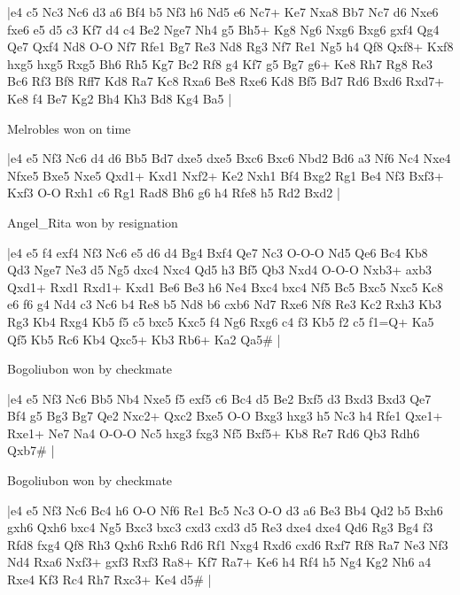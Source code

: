 \makegametitle
|e4 c5 Nc3 Nc6 d3 a6 Bf4 b5 Nf3 h6 Nd5 e6 Nc7+ Ke7 Nxa8 Bb7 Nc7 d6 Nxe6 fxe6 e5 d5 c3 Kf7 d4 c4 Be2 Nge7 Nh4 g5 Bh5+ Kg8 Ng6 Nxg6 Bxg6 gxf4 Qg4 Qe7 Qxf4 Nd8 O-O Nf7 Rfe1 Bg7 Re3 Nd8 Rg3 Nf7 Re1 Ng5 h4 Qf8 Qxf8+ Kxf8 hxg5 hxg5 Rxg5 Bh6 Rh5 Kg7 Bc2 Rf8 g4 Kf7 g5 Bg7 g6+ Ke8 Rh7 Rg8 Re3 Bc6 Rf3 Bf8 Rff7 Kd8 Ra7 Kc8 Rxa6 Be8 Rxe6 Kd8 Bf5 Bd7 Rd6 Bxd6 Rxd7+ Ke8 f4 Be7 Kg2 Bh4 Kh3 Bd8 Kg4 Ba5  |

\showboard

Melrobles won on time

\makegametitle
|e4 e5 Nf3 Nc6 d4 d6 Bb5 Bd7 dxe5 dxe5 Bxc6 Bxc6 Nbd2 Bd6 a3 Nf6 Nc4 Nxe4 Nfxe5 Bxe5 Nxe5 Qxd1+ Kxd1 Nxf2+ Ke2 Nxh1 Bf4 Bxg2 Rg1 Be4 Nf3 Bxf3+ Kxf3 O-O Rxh1 c6 Rg1 Rad8 Bh6 g6 h4 Rfe8 h5 Rd2 Bxd2  |

\showboard

Angel\_Rita won by resignation

\makegametitle
|e4 e5 f4 exf4 Nf3 Nc6 e5 d6 d4 Bg4 Bxf4 Qe7 Nc3 O-O-O Nd5 Qe6 Bc4 Kb8 Qd3 Nge7 Ne3 d5 Ng5 dxc4 Nxc4 Qd5 h3 Bf5 Qb3 Nxd4 O-O-O Nxb3+ axb3 Qxd1+ Rxd1 Rxd1+ Kxd1 Be6 Be3 h6 Ne4 Bxc4 bxc4 Nf5 Bc5 Bxc5 Nxc5 Kc8 e6 f6 g4 Nd4 c3 Nc6 b4 Re8 b5 Nd8 b6 cxb6 Nd7 Rxe6 Nf8 Re3 Kc2 Rxh3 Kb3 Rg3 Kb4 Rxg4 Kb5 f5 c5 bxc5 Kxc5 f4 Ng6 Rxg6 c4 f3 Kb5 f2 c5 f1=Q+ Ka5 Qf5 Kb5 Rc6 Kb4 Qxc5+ Kb3 Rb6+ Ka2 Qa5\#  |

\showboard

Bogoliubon won by checkmate

\makegametitle
|e4 e5 Nf3 Nc6 Bb5 Nb4 Nxe5 f5 exf5 c6 Bc4 d5 Be2 Bxf5 d3 Bxd3 Bxd3 Qe7 Bf4 g5 Bg3 Bg7 Qe2 Nxc2+ Qxc2 Bxe5 O-O Bxg3 hxg3 h5 Nc3 h4 Rfe1 Qxe1+ Rxe1+ Ne7 Na4 O-O-O Nc5 hxg3 fxg3 Nf5 Bxf5+ Kb8 Re7 Rd6 Qb3 Rdh6 Qxb7\#  |

\showboard

Bogoliubon won by checkmate

\makegametitle
|e4 e5 Nf3 Nc6 Bc4 h6 O-O Nf6 Re1 Bc5 Nc3 O-O d3 a6 Be3 Bb4 Qd2 b5 Bxh6 gxh6 Qxh6 bxc4 Ng5 Bxc3 bxc3 cxd3 cxd3 d5 Re3 dxe4 dxe4 Qd6 Rg3 Bg4 f3 Rfd8 fxg4 Qf8 Rh3 Qxh6 Rxh6 Rd6 Rf1 Nxg4 Rxd6 cxd6 Rxf7 Rf8 Ra7 Ne3 Nf3 Nd4 Rxa6 Nxf3+ gxf3 Rxf3 Ra8+ Kf7 Ra7+ Ke6 h4 Rf4 h5 Ng4 Kg2 Nh6 a4 Rxe4 Kf3 Rc4 Rh7 Rxc3+ Ke4 d5\#  |


